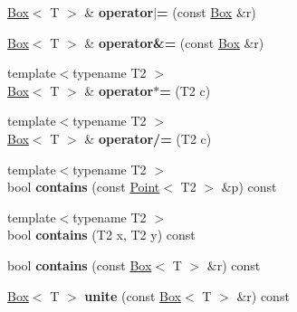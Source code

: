 \begin{DoxyCompactItemize}
\item 
\hypertarget{class_box_a39321d3603921427af4abc73cf6409df}{
\hyperlink{class_box}{Box}$<$ T $>$ \& {\bfseries operator$|$=} (const \hyperlink{class_box}{Box} \&r)}
\label{class_box_a39321d3603921427af4abc73cf6409df}

\item 
\hypertarget{class_box_acbbf74126e4790b025fdfb4942d5b7e7}{
\hyperlink{class_box}{Box}$<$ T $>$ \& {\bfseries operator\&=} (const \hyperlink{class_box}{Box} \&r)}
\label{class_box_acbbf74126e4790b025fdfb4942d5b7e7}

\item 
\hypertarget{class_box_aa18658b5477c00c191f9b3c855924b2f}{
{\footnotesize template$<$typename T2 $>$ }\\\hyperlink{class_box}{Box}$<$ T $>$ \& {\bfseries operator$\ast$=} (T2 c)}
\label{class_box_aa18658b5477c00c191f9b3c855924b2f}

\item 
\hypertarget{class_box_a51aa00812060d1e4665b4a0be9935cb8}{
{\footnotesize template$<$typename T2 $>$ }\\\hyperlink{class_box}{Box}$<$ T $>$ \& {\bfseries operator/=} (T2 c)}
\label{class_box_a51aa00812060d1e4665b4a0be9935cb8}

\item 
\hypertarget{class_box_a349c282feb79bd25acd2e019e324cb29}{
{\footnotesize template$<$typename T2 $>$ }\\bool {\bfseries contains} (const \hyperlink{class_point}{Point}$<$ T2 $>$ \&p) const }
\label{class_box_a349c282feb79bd25acd2e019e324cb29}

\item 
\hypertarget{class_box_ac9591ddb1c83a71913baaa7339b6b320}{
{\footnotesize template$<$typename T2 $>$ }\\bool {\bfseries contains} (T2 x, T2 y) const }
\label{class_box_ac9591ddb1c83a71913baaa7339b6b320}

\item 
\hypertarget{class_box_add30ee8481bd46e34b4f3a63a126712a}{
bool {\bfseries contains} (const \hyperlink{class_box}{Box}$<$ T $>$ \&r) const }
\label{class_box_add30ee8481bd46e34b4f3a63a126712a}

\item 
\hypertarget{class_box_aeed25d0e0ffb49e8e77ca3bd36509017}{
\hyperlink{class_box}{Box}$<$ T $>$ {\bfseries unite} (const \hyperlink{class_box}{Box}$<$ T $>$ \&r) const }
\label{class_box_aeed25d0e0ffb49e8e77ca3bd36509017}


\end{DoxyCompactItemize}
